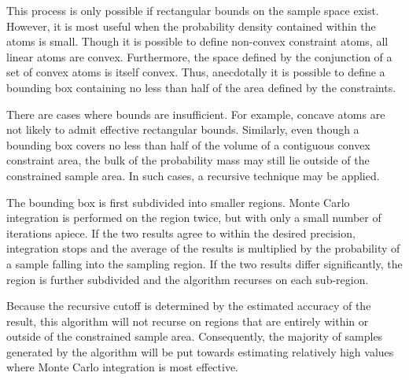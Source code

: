 This  process is  only possible  if rectangular  bounds on  the sample
space exist.  However, it is  most useful when the probability density
contained within the atoms is  small.  Though it is possible to define
non-convex   constraint   atoms,   all   linear  atoms   are   convex.
Furthermore, the space  defined by the conjunction of  a set of convex
atoms is itself  convex.  Thus, anecdotally it is possible to
define a bounding box containing no less than half of the area defined
by the constraints.


There are  cases where bounds are insufficient.   For example, concave
atoms  are   not  likely   to  admit  effective   rectangular  bounds.
Similarly, even though a bounding box  covers no less than half of the
volume of a contiguous convex constraint area, the  bulk of the  probability mass may
still lie  outside of the constrained  sample area.  In  such cases, a
recursive technique may be applied.

The  bounding box  is first  subdivided into  smaller  regions.  Monte
Carlo integration  is performed on the  region twice, but  with only a
small number of iterations apiece.  If the two results agree to within
the  desired  precision, integration  stops  and  the  average of  the
results is multiplied by the  probability of a sample falling into the
sampling region.  If the  two results differ significantly, the region
is further subdivided and the algorithm recurses on each sub-region.

Because the  recursive cutoff is determined by  the estimated accuracy
of the  result, this  algorithm will not  recurse on regions  that are
entirely   within  or   outside  of   the  constrained   sample  area.
Consequently, the majority of  samples generated by the algorithm will
be  put towards estimating  relatively high  values where  Monte Carlo
integration is most effective.


